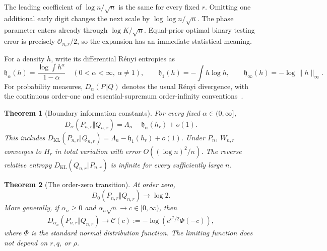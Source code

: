 \documentclass[11pt,oneside]{article}
\numberwithin{equation}{section}
\theoremstyle{plain}
\newtheorem{theorem}{Theorem}[section]
\theoremstyle{definition}
\theoremstyle{remark}
\newcommand{\KL}{D_{\mathrm{KL}}}
\newcommand{\OO}{\mathcal O}
\begin{document}
The leading coefficient of $\log n/\sqrt n$ is the same for every
fixed $r$. Omitting one additional early digit changes the next scale by
$\log\log n/\sqrt n$. The phase parameter enters already through
$\log K/\sqrt n$. Equal-prior optimal binary testing error is precisely
$\OO_{n,r}/2$, so the expansion has an immediate statistical meaning.

For a density $h$, write its differential R\'enyi entropies as
\begin{equation}\label{eq:entropydef}
 \mathfrak h_\alpha(h)=\frac{\log\int h^\alpha}{1-\alpha}
 \quad(0<\alpha<\infty,\ \alpha\ne1),\qquad
 \mathfrak h_1(h)=-\int h\log h,\qquad
 \mathfrak h_\infty(h)=-\log\|h\|_\infty.
\end{equation}
For probability measures, $D_\alpha(P\Vert Q)$ denotes the usual R\'enyi
divergence, with the continuous order-one and essential-supremum
order-infinity conventions~\cite{renyi}.

\begin{theorem}[Boundary information constants]\label{thm:entropy}
For every fixed $\alpha\in(0,\infty]$,
\begin{equation}\label{eq:renyifixed}
 D_\alpha(P_{n,r}\Vert Q_{n,r})
   =\Lambda_n-\mathfrak h_\alpha(h_r)+o(1).
\end{equation}
This includes
$\KL(P_{n,r}\Vert Q_{n,r})=\Lambda_n-\mathfrak h_1(h_r)+o(1)$.
Under $P_n$, $W_{n,r}$ converges to $H_r$ in total variation with error
$O((\log n)^2/n)$. The reverse relative entropy
$\KL(Q_{n,r}\Vert P_{n,r})$ is infinite for every sufficiently large $n$.
\end{theorem}

\begin{theorem}[The order-zero transition]\label{thm:crossover}
At order zero,
\begin{equation}\label{eq:orderzero}
 D_0(P_{n,r}\Vert Q_{n,r})\longrightarrow\log2.
\end{equation}
More generally, if $\alpha_n\ge0$ and $\alpha_n\sqrt n\to c\in[0,\infty)$,
then
\begin{equation}\label{eq:crossover}
 D_{\alpha_n}(P_{n,r}\Vert Q_{n,r})
 \longrightarrow
 \mathcal C(c):=-\log\!\left(e^{c^2/2}\Phi(-c)\right),
\end{equation}
where $\Phi$ is the standard normal distribution function. The limiting
function does not depend on $r,q$, or $\rho$.
\end{theorem}
\end{document}
